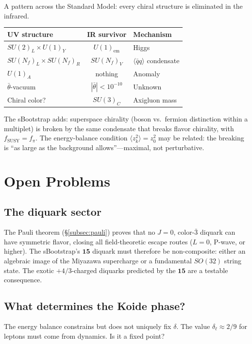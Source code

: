 \documentclass[12pt,a4paper]{article}
\newcommand{\qqbar}{\langle\bar{q}q\rangle}
\begin{document}
A pattern across the Standard Model: every chiral structure is 
eliminated in the infrared.

\begin{center}
\begin{tabular}{lcl}
\toprule
UV structure & IR survivor & Mechanism \\
\midrule
$SU(2)_L \times U(1)_Y$ & $U(1)_{\text{em}}$ & Higgs \\
$SU(N_f)_L \times SU(N_f)_R$ & $SU(N_f)_V$ & $\qqbar$ condensate \\
$U(1)_A$ & nothing & Anomaly \\
$\bar{\theta}$-vacuum & $|\bar{\theta}| < 10^{-10}$ & Unknown \\
Chiral color? & $SU(3)_C$ & Axigluon mass \\
\bottomrule
\end{tabular}
\end{center}

The sBootstrap adds: superspace chirality (boson vs.\ fermion 
distinction within a multiplet) is broken by the same condensate 
that breaks flavor chirality, with $f_{\text{SUSY}} = f_\pi$. The 
energy-balance condition $\langle z_k^2\rangle = z_0^2$ may be 
related: the breaking is ``as large as the background 
allows''---maximal, not perturbative.

\section{Open Problems}
\label{sec:open}

\subsection{The diquark sector}
The Pauli theorem (\S\ref{subsec:pauli}) proves that no $J=0$, 
color-$\bar{3}$ diquark can have symmetric flavor, closing all 
field-theoretic escape routes ($L=0$, P-wave, or higher). The 
sBootstrap's $\mathbf{15}$ diquark must therefore be non-composite: 
either an algebraic image of the Miyazawa supercharge or a 
fundamental $SO(32)$ string state. The exotic $+4/3$-charged 
diquarks predicted by the $\mathbf{15}$ are a testable consequence.

\subsection{What determines the Koide phase?}
The energy balance constrains but does not uniquely fix $\delta$. 
The value $\delta_\ell \approx 2/9$ for leptons must come from 
dynamics. Is it a fixed point?
\end{document}
